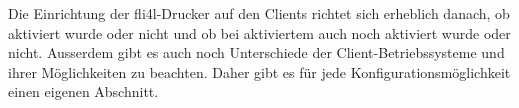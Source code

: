
    Die Einrichtung der fli4l-Drucker auf den Clients richtet sich erheblich
    danach, ob  aktiviert wurde oder nicht
    und ob bei aktiviertem  auch noch 
    aktiviert wurde oder nicht.
    Ausserdem gibt es auch noch Unterschiede der Client-Betriebssysteme und
    ihrer Möglichkeiten zu beachten.
    Daher gibt es für jede Konfigurationsmöglichkeit einen eigenen Abschnitt.



